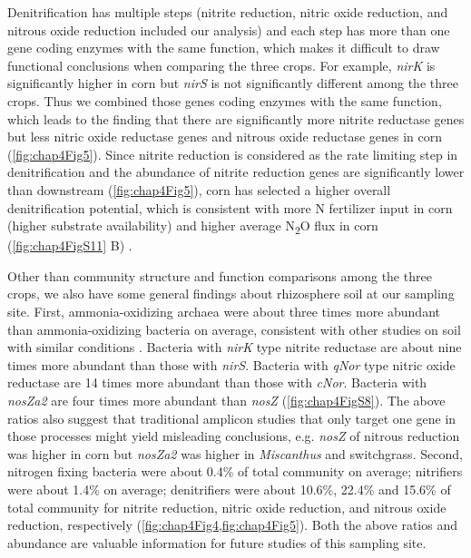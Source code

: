 \documentclass[]{msu-thesis}
\begin{document}
Denitrification has multiple steps (nitrite reduction, nitric oxide reduction,
and nitrous oxide reduction included our analysis) and each step has more than
one gene coding enzymes with the same function, which makes it difficult to
draw functional conclusions when comparing the three crops. For example,
\textit{nirK} is significantly higher in corn but \textit{nirS} is not
significantly different among the three crops. Thus we combined those genes
coding enzymes with the same function, which leads to the finding that there
are significantly more nitrite reductase genes but less nitric oxide reductase
genes and nitrous oxide reductase genes in corn (\cref{fig:chap4Fig5}). Since
nitrite reduction is considered as the rate limiting step in denitrification
\cite{zumft_cell_1997} and the abundance of nitrite reduction genes are
significantly lower than downstream (\cref{fig:chap4Fig5}), corn has selected a
higher overall denitrification potential, which is consistent with more N
fertilizer input in corn (higher substrate availability) and higher average N\textsubscript{2}O
flux in corn (\cref{fig:chap4FigS11} B) \cite{oates_nitrous_2015}.

Other than community structure and function comparisons among the three crops,
we also have some general findings about rhizosphere soil at our sampling site.
First, ammonia-oxidizing archaea were about three times more abundant than
ammonia-oxidizing bacteria on average, consistent with other studies on soil
with similar conditions
\cite{leininger_archaea_2006,prosser_archaeal_2012,gubry-rangin_archaea_2010}.
Bacteria with \textit{nirK} type nitrite reductase are about nine times more
abundant than those with \textit{nirS}. Bacteria with \textit{qNor} type nitric
oxide reductase are 14 times more abundant than those with \textit{cNor}.
Bacteria with \textit{nosZa2} are four times more abundant than \textit{nosZ}
(\cref{fig:chap4FigS8}). The above ratios also suggest that traditional
amplicon studies that only target one gene in those processes might yield
misleading conclusions, e.g. \textit{nosZ} of nitrous reduction was higher in
corn but \textit{nosZa2} was higher in \textit{Miscanthus} and switchgrass.
Second, nitrogen fixing bacteria were about 0.4\% of total community on
average; nitrifiers were about 1.4\% on average; denitrifiers were about
10.6\%, 22.4\% and 15.6\% of total community for nitrite reduction, nitric
oxide reduction, and nitrous oxide reduction, respectively
(\cref{fig:chap4Fig4,fig:chap4Fig5}). Both the above ratios and abundance are
valuable information for future studies of this sampling site.
\end{document}
